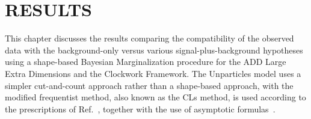 \chapter{RESULTS}\label{ch:results}
\RaggedRight \parindent=25pt
This chapter discusses the results comparing the compatibility of the observed data with the background-only versus various signal-plus-background hypotheses using a shape-based Bayesian Marginalization procedure for the ADD Large Extra Dimensions and the Clockwork Framework. The Unparticles model uses a simpler cut-and-count approach rather than a shape-based approach, with the modified frequentist method, also known as the CLs method, is used according to the prescriptions of Ref.~\cite{ATLAS:1379837}, together with the use of asymptotic formulas~\cite{Cowan:2010js}.






